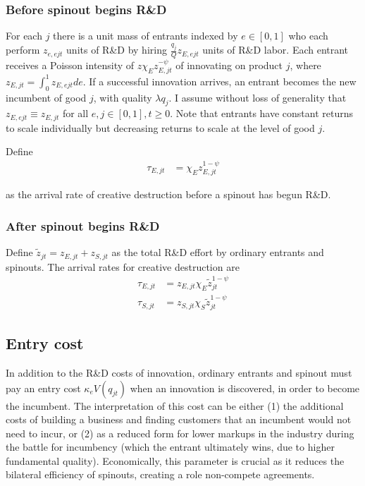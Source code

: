 \documentclass[12pt,english]{article}
\theoremstyle{remark}
\begin{document}
\subsubsection{Before spinout begins R\&D}

For each $j$ there is a unit mass of entrants indexed by $e \in [0,1]$ who each perform $z_{e,ejt}$ units of R\&D by hiring $\frac{q_j}{Q} z_{E,ejt}$ units of R\&D labor. Each entrant receives a Poisson intensity of $z \chi_E z_{E,jt}^{-\psi}$ of innovating on product $j$, where $z_{E,jt} = \int_0^1 z_{E,ejt} de$. If a successful innovation arrives, an entrant becomes the new incumbent of good $j$, with quality $\lambda q_j$. I assume without loss of generality that $z_{E,ejt} \equiv z_{E,jt}$ for all $e,j \in [0,1], t \ge 0$. Note that entrants have constant returns to scale individually but decreasing returns to scale at the level of good $j$.

Define
\begin{align*}
	\tau_{E,jt} &= \chi_E z_{E,jt}^{1-\psi}
\end{align*}

as the arrival rate of creative destruction before a spinout has begun R\&D.

\subsubsection{After spinout begins R\&D}

Define $\tilde{z}_{jt} = z_{E,jt} + z_{S,jt}$ as the total R\&D effort by ordinary entrants and spinouts. The arrival rates for creative destruction are
\begin{align*}
	\tau_{E,jt} &= z_{E,jt} \chi_E \tilde{z}_{jt}^{1-\psi} \\
	\tau_{S,jt} &= z_{S,jt} \chi_S \tilde{z}_{jt}^{1-\psi}
\end{align*}

\subsection{Entry cost}

In addition to the R\&D costs of innovation, ordinary entrants and spinout must pay an entry cost $\kappa_{e} V(q_{jt})$ when an innovation is discovered, in order to become the incumbent. The interpretation of this cost can be either (1) the additional costs of building a business and finding customers that an incumbent would not need to incur, or (2) as a reduced form for lower markups in the industry during the battle for incumbency (which the entrant ultimately wins, due to higher fundamental quality). Economically, this parameter is crucial as it reduces the bilateral efficiency of spinouts, creating a role non-compete agreements. 
\end{document}
